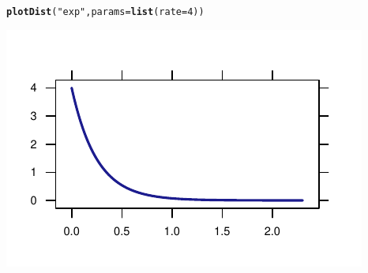 \documentclass[twoside]{book}\usepackage[]{graphicx}\usepackage[]{xcolor}
\makeatletter
\def\maxwidth{ %
  \ifdim\Gin@nat@width>\linewidth
    \linewidth
  \else
    \Gin@nat@width
  \fi
}
\newcommand{\hlnum}[1]{\textcolor[rgb]{0.686,0.059,0.569}{#1}}%
\newcommand{\hlstr}[1]{\textcolor[rgb]{0.192,0.494,0.8}{#1}}%
\newcommand{\hlstd}[1]{\textcolor[rgb]{0.345,0.345,0.345}{#1}}%
\newcommand{\hlkwc}[1]{\textcolor[rgb]{0.333,0.667,0.333}{#1}}%
\newcommand{\hlkwd}[1]{\textcolor[rgb]{0.737,0.353,0.396}{\textbf{#1}}}%
\newenvironment{kframe}{%
 \def\at@end@of@kframe{}%
 \ifinner\ifhmode%
  \def\at@end@of@kframe{\end{minipage}}%
  \begin{minipage}{\columnwidth}%
 \fi\fi%
 \def\FrameCommand##1{\hskip\@totalleftmargin \hskip-\fboxsep
 \colorbox{shadecolor}{##1}\hskip-\fboxsep
     \hskip-\linewidth \hskip-\@totalleftmargin \hskip\columnwidth}%
 \MakeFramed {\advance\hsize-\width
   \@totalleftmargin\z@ \linewidth\hsize
   \@setminipage}}%
 {\par\unskip\endMakeFramed%
 \at@end@of@kframe}
\newenvironment{knitrout}{}{} %
\newlength{\tempfmlength}
\newenvironment{fmpage}[1]
     {
	 \medskip
	 \setlength{\tempfmlength}{#1}
	 \begin{lrbox}{\fmbox}
	   \begin{minipage}{#1}
		 \vspace*{.02\tempfmlength}
		 \hfill
	   \begin{minipage}{.95 \tempfmlength}}
		 {\end{minipage}\hfill
		 \vspace*{.015\tempfmlength}
		 \end{minipage}\end{lrbox}\fbox{\usebox{\fmbox}}
	 \medskip
	 }
\newenvironment{boxedText}[1][.98\textwidth]%
{%
\begin{center}
\begin{fmpage}{#1}
}%
{%
\end{fmpage}
\end{center}
}
\makeatother
\begin{document}

\begin{knitrout}
\color{fgcolor}\begin{kframe}
\begin{alltt}
\hlkwd{plotDist}\hlstd{(}\hlstr{"exp"}\hlstd{,} \hlkwc{params}\hlstd{=}\hlkwd{list}\hlstd{(}\hlkwc{rate}\hlstd{=}\hlnum{4}\hlstd{))}
\end{alltt}
\end{kframe}

{\centering \includegraphics[width=\maxwidth]{figures/fig-plotDist-eponential-1} 

}



\end{knitrout}
\end{document}
